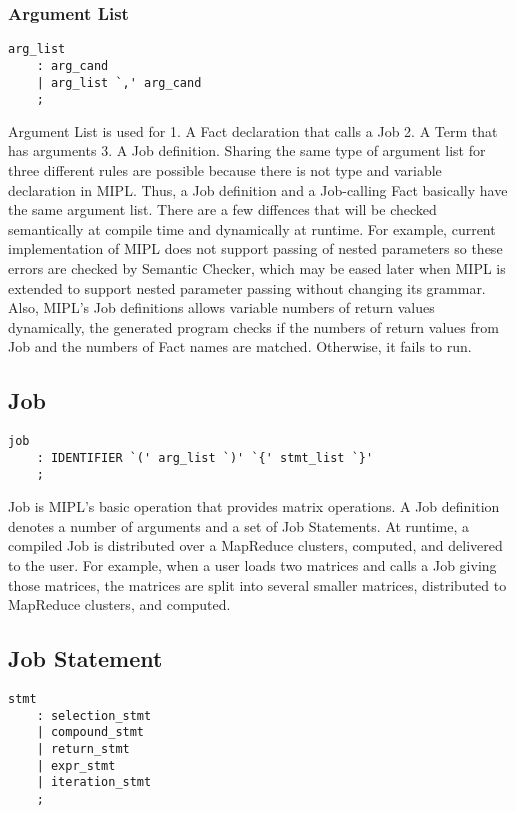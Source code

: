 \documentclass[prodmode,acmtecs]{acmsmall}
\begin{document}
\subsubsection{Argument List}
\begin{lstlisting}
arg_list
	: arg_cand
	| arg_list `,' arg_cand
	;
\end{lstlisting}

Argument List is used for 1. A Fact declaration that calls a Job
2. A Term that has arguments 3. A Job definition.  Sharing the
same type of argument list for three different rules are possible
because there is not type and variable declaration in MIPL.  Thus,
a Job definition and a Job-calling Fact basically have the same
argument list.  There are a few diffences that will be checked
semantically at compile time and dynamically at runtime.  For example,
current implementation of MIPL does not support passing of nested
parameters so these errors are checked by Semantic Checker, which may
be eased later when MIPL is extended to support nested parameter passing
without changing its grammar.  Also, MIPL's Job definitions allows
variable numbers of return values dynamically, the generated program
checks if the numbers of return values from Job and the numbers of
Fact names are matched.  Otherwise, it fails to run.
\medskip

\subsection{Job}

\begin{lstlisting}
job
	: IDENTIFIER `(' arg_list `)' `{' stmt_list `}'
	;
\end{lstlisting}

\label{Job_Section}
Job is MIPL's basic operation that provides matrix operations.
A Job definition denotes a number of arguments and a set of Job
Statements.  At runtime, a compiled Job is distributed over
a MapReduce clusters, computed, and delivered to the user. For
example, when a user loads two matrices and calls a Job giving those
matrices, the matrices are split into several smaller matrices,
distributed to MapReduce clusters, and computed.
\medskip

\subsection{Job Statement}

\begin{lstlisting}
stmt
	: selection_stmt
	| compound_stmt
	| return_stmt
	| expr_stmt
	| iteration_stmt
	;
\end{lstlisting}
\end{document}
